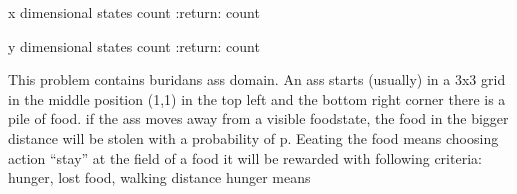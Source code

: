 \documentclass[letterpaper,10pt,english]{sphinxmanual}
\begin{document}
\begin{fulllineitems}
\begin{fulllineitems}
\end{fulllineitems}


\begin{fulllineitems}
\label{Problems:morl_problems.MOPuddleworldProblem.scene_x_dim}
x dimensional states count
:return: count

\end{fulllineitems}


\begin{fulllineitems}
\label{Problems:morl_problems.MOPuddleworldProblem.scene_y_dim}
y dimensional states count
:return: count

\end{fulllineitems}


\end{fulllineitems}


\begin{fulllineitems}
\label{Problems:morl_problems.MORLBuridansAss1DProblem}
This problem contains buridans ass domain. An ass starts (usually) in a 3x3 grid in the middle position (1,1)
in the top left and the bottom right corner there is a pile of food. if the ass moves away from a visible foodstate,
the food in the bigger distance will be stolen with a probability of p. Eeating the food means choosing action
``stay'' at the field of a food
it will be rewarded with following criteria: hunger, lost food, walking distance
hunger means

\end{fulllineitems}

\end{document}
